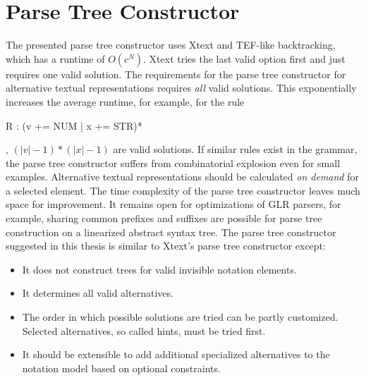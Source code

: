 \section{Parse Tree Constructor}
The presented parse tree constructor uses Xtext and TEF-like backtracking, which has a runtime of $O(c^N)$. Xtext tries the last valid option first and just requires one valid solution. The requirements for the parse tree constructor for alternative textual representations requires \emph{all} valid solutions. This exponentially increases the average runtime, for example, for the rule
\begin{xtxt}
R : (v += NUM | x += STR)*
\end{xtxt}, $( |v| - 1 ) * ( |x| - 1)$ are valid solutions. If similar rules exist in the grammar, the parse tree constructor suffers from combinatorial explosion even for small examples.  Alternative textual representations should be calculated \emph{on demand} for a selected element. The time complexity of the parse tree constructor leaves much space for improvement. It remains open for optimizations of GLR parsers, for example, sharing common prefixes and suffixes are possible for parse tree construction on a linearized abstract syntax tree. The parse tree constructor suggested in this thesis is similar to Xtext's parse tree constructor except:
\begin{itemize}
	\item It does not construct trees for valid invisible notation elements.
	\item It determines all valid alternatives.
	\item The order in which possible solutions are tried can be partly customized. Selected alternatives, so called hints, must be tried first.
	\item It should be extensible to add additional specialized alternatives to the notation model based on optional constraints.
\end{itemize}

